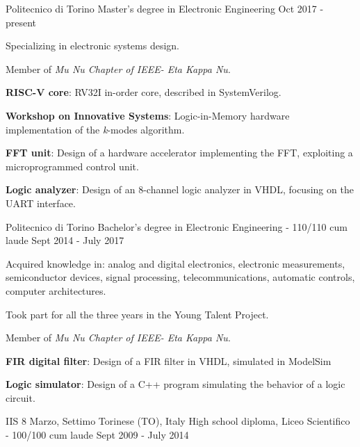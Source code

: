 \begin{cventries}
	\cventry
    {Politecnico di Torino}
    {Master's degree in Electronic Engineering}
    {Oct 2017 - present}
    {}
    {
      \begin{cvitems}
      	\item {Specializing in electronic systems design.}
      	\item {Member of \emph{Mu Nu Chapter of IEEE- Eta Kappa Nu}.} 
      \end{cvitems}
    }

	{
    \begin{cvitems}
      \item {\textbf{RISC-V core}: RV32I in-order core, described in SystemVerilog.}
      \item {\textbf{Workshop on Innovative Systems}: Logic-in-Memory hardware implementation of the \emph{k}-modes algorithm.}
			\item {\textbf{FFT unit}: Design of a hardware accelerator implementing the FFT, exploiting a microprogrammed control unit.}
			\item {\textbf{Logic analyzer}: Design of an 8-channel logic analyzer in VHDL, focusing on the UART interface.}
		\end{cvitems}
	}    
    
  \cventry
    {Politecnico di Torino}
    {Bachelor's degree in Electronic Engineering - 110/110 cum laude}
    {Sept 2014 - July 2017}
    {}
    {
      \begin{cvitems}
      	\item {Acquired knowledge in: analog and digital electronics, electronic measurements, semiconductor devices, signal processing, telecommunications, automatic controls, computer architectures.}
        \item {Took part for all the three years in the Young Talent Project}.
        \item {Member of \emph{Mu Nu Chapter of IEEE- Eta Kappa Nu}.}
      \end{cvitems}  
    }
    
		{
			\begin{cvitems}
			    \item {\textbf{FIR digital filter}: Design of a FIR filter in VHDL, simulated in ModelSim}
				\item {\textbf{Logic simulator}: Design of a C++ program simulating the behavior of a logic circuit.}
			\end{cvitems}
		}    
    
    \cventry
    {IIS 8 Marzo, Settimo Torinese (TO), Italy}
    {High school diploma, Liceo Scientifico - 100/100 cum laude}
    {Sept 2009 - July 2014}
    {}
    {}
\end{cventries}


 